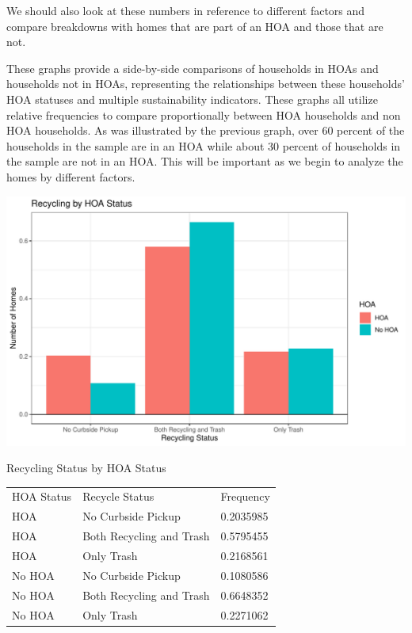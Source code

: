 \documentclass{article}
\begin{document}
We should also look at these numbers in reference to different factors and compare breakdowns with homes that are part of an HOA and those that are not.


These graphs provide a side-by-side comparisons of households in HOAs and households not in HOAs, representing the relationships between these households' HOA statuses and multiple sustainability indicators. These graphs all utilize relative frequencies to compare proportionally between HOA households and non HOA households. As was illustrated by the previous graph, over 60 percent of the households in the sample are in an HOA while about 30 percent of households in the sample are not in an HOA. This will be important as we begin to analyze the homes by different factors. 


\newpage
\includegraphics{exam1-008}
\newline
\begin{center}Recycling Status by HOA Status\end{center}
\begin{table}[h]
\begin{tabular}{lll}
HOA Status   & Recycle Status & Frequency      \\
HOA    & No Curbside Pickup       & 0.2035985 \\
HOA    & Both Recycling and Trash       & 0.5795455 \\
HOA    & Only Trash       & 0.2168561 \\
No HOA & No Curbside Pickup       & 0.1080586 \\
No HOA & Both Recycling and Trash       & 0.6648352 \\
No HOA & Only Trash       & 0.2271062
\end{tabular}
\end{table}
\end{document}
